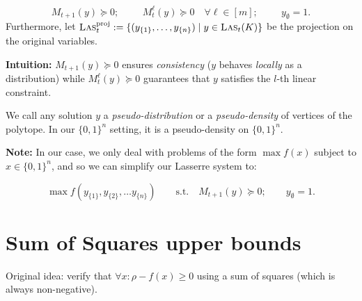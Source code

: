 \begin{multicols}{3}
{\[
  M_{t+1}(y) \succeq 0; \hspace{1cm} M_t^\ell(y) \succeq 0 \quad \forall\ell\in[m]; \hspace{1cm} y_{\emptyset}=1.
\]
Furthermore, let  $\textsc{Las}_t^{\textrm{proj}} := \{ (y_{\{1\}},\ldots,y_{\{n\}}) \mid y \in \textsc{Las}_t(K) \}$ be the projection on the original variables. 
}

\textbf{Intuition:} $M_{t+1}(y) \succeq 0$ ensures \textit{consistency}
($y$ behaves \textit{locally} as a distribution) while $M_t^\ell(y) \succeq 0$
guarantees that $y$ satisfies the $l$-th linear constraint.

We call any solution $y$ a \emph{pseudo-distribution} or a \emph{pseudo-density}
of vertices of the polytope. In our $\{0,1\}^n$ setting, it is a pseudo-density
on $\{0,1\}^n$.

\textbf{Note:} In our case, we only deal with problems of the form $\max f(x)$ subject to  $x ∈ \{0,1\}^n$,
and so we can simplify our Lasserre system to:

\[ \max f(y_{\{1\}}, y_{\{2\}}, … y_{\{n\}}) \qquad\textrm{s.t.}\quad M_{t+1}(y) \succeq 0;\qquad  y_{\emptyset}=1. \]


\section{Sum of Squares upper bounds}


Original idea: verify that $∀x: ρ-f(x) ≥ 0$ using a sum of squares (which is always non-negative).




\end{multicols}
